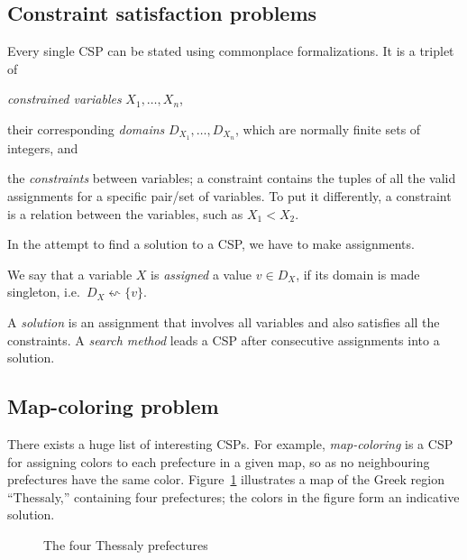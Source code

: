 \documentclass{ws-ijait}
\begin{document}
\subsection{Constraint satisfaction problems}

Every single CSP can be stated using commonplace
formalizations.\cite{Russell2010} It is a triplet of
\begin{romanlist}
  \item \emph{constrained variables} $X_1, \ldots, X_n$,
  \item their corresponding \emph{domains} $D_{X_1}, \ldots,
        D_{X_n}$, which are normally finite sets of
        integers, and
  \item the \emph{constraints} between variables; a
        constraint contains the tuples of all the valid
        assignments for a specific pair\slash set of
        variables. To put it differently, a constraint is a
        relation between the variables, such as $X_1 < X_2$.
\end{romanlist}
In the attempt to find a solution to a CSP, we have to make
assignments.
\begin{definition}
  We say that a variable $X$ is \emph{assigned} a value $v
  \in D_X$, if its domain is made singleton, i.e.\ $D_X
  \leftsquigarrow \{v\}$.
\end{definition}
A \emph{solution} is an assignment that involves all
variables and also satisfies all the constraints. A
\emph{search method} leads a CSP after consecutive
assignments into a solution.

\subsection{Map-coloring problem}

There exists a huge list of interesting CSPs.\cite{Gent1999}
For example, \emph{map-coloring} is a CSP for assigning
colors to each prefecture in a given map, so as no
neighbouring prefectures have the same color.
Figure~\ref{map-colored} illustrates a map of the Greek
region ``Thessaly,'' containing four prefectures; the colors
in the figure form an indicative solution.

\begin{figure}
  \centering
  
  \caption{The four Thessaly prefectures\label{map-colored}}
\end{figure}
\end{document}
